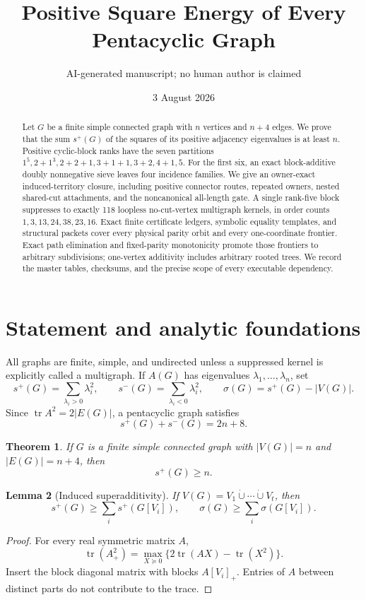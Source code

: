 \documentclass[11pt]{article}
\title{Positive Square Energy of Every Pentacyclic Graph}
\author{AI-generated manuscript; no human author is claimed}
\date{3 August 2026}
\newtheorem{theorem}{Theorem}[section]
\newtheorem{lemma}[theorem]{Lemma}
\theoremstyle{remark}
\newcommand{\spn}{s^+}
\newcommand{\smn}{s^-}
\newcommand{\sig}{\sigma}
\begin{document}
\maketitle

\begin{abstract}
Let $G$ be a finite simple connected graph with $n$ vertices and $n+4$
edges.  We prove that the sum $\spn(G)$ of the squares of its positive
adjacency eigenvalues is at least $n$.  Positive cyclic-block ranks have the
seven partitions
$1^5,2+1^3,2+2+1,3+1+1,3+2,4+1,5$.
For the first six, an exact block-additive doubly nonnegative sieve leaves four
incidence families.  We give an owner-exact induced-territory closure, including
positive connector routes, repeated owners, nested shared-cut attachments, and
the noncanonical all-length gate.  A single rank-five block suppresses to
exactly 118 loopless no-cut-vertex multigraph kernels, in order counts
$1,3,13,24,38,23,16$.  Exact finite certificate ledgers, symbolic equality
templates, and structural packets cover every physical parity orbit and every
one-coordinate frontier.  Exact path elimination and fixed-parity monotonicity
promote those frontiers to arbitrary subdivisions; one-vertex additivity
includes arbitrary rooted trees.  We record the master tables, checksums, and
the precise scope of every executable dependency.
\end{abstract}

\section{Statement and analytic foundations}

All graphs are finite, simple, and undirected unless a suppressed kernel is
explicitly called a multigraph.  If $A(G)$ has eigenvalues
$\lambda_1,\ldots,\lambda_n$, set
\[
 \spn(G)=\sum_{\lambda_i>0}\lambda_i^2,
 \qquad \smn(G)=\sum_{\lambda_i<0}\lambda_i^2,
 \qquad \sig(G)=\spn(G)-|V(G)|.
\]
Since $\operatorname{tr}A^2=2|E(G)|$, a pentacyclic graph satisfies
\begin{equation}\label{eq:trace}
 \spn(G)+\smn(G)=2n+8.
\end{equation}

\begin{theorem}\label{thm:main}
If $G$ is a finite simple connected graph with $|V(G)|=n$ and
$|E(G)|=n+4$, then
\[
 \boxed{\spn(G)\ge n}.
\]
\end{theorem}

\begin{lemma}[Induced superadditivity]\label{lem:pinch}
If $V(G)=V_1\mathbin{\dot\cup}\cdots\mathbin{\dot\cup}V_t$, then
\[
 \spn(G)\ge\sum_i\spn(G[V_i]),\qquad
 \sig(G)\ge\sum_i\sig(G[V_i]).
\]
\end{lemma}
\begin{proof}
For every real symmetric matrix $A$,
\[
 \operatorname{tr}(A_+^2)=
 \max_{X\succeq0}\{2\operatorname{tr}(AX)-\operatorname{tr}(X^2)\}.
\]
Insert the block diagonal matrix with blocks $A[V_i]_+$.  Entries of $A$
between distinct parts do not contribute to the trace.
\end{proof}
\end{document}
